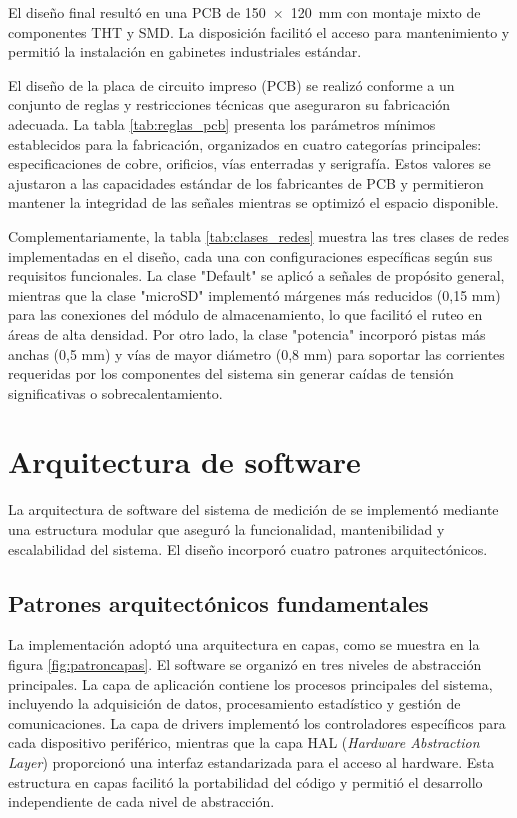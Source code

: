 El diseño final resultó en una PCB de \SI{150x120}{\milli\meter} con montaje mixto de componentes THT y SMD. La disposición facilitó el acceso para mantenimiento y permitió la instalación en gabinetes industriales estándar.

El diseño de la placa de circuito impreso (PCB) se realizó conforme a un conjunto de reglas y restricciones técnicas que aseguraron su fabricación adecuada. La tabla \ref{tab:reglas_pcb} presenta los parámetros mínimos establecidos para la fabricación, organizados en cuatro categorías principales: especificaciones de cobre, orificios, vías enterradas y serigrafía. Estos valores se ajustaron a las capacidades estándar de los fabricantes de PCB y permitieron mantener la integridad de las señales mientras se optimizó el espacio disponible.

Complementariamente, la tabla \ref{tab:clases_redes} muestra las tres clases de redes implementadas en el diseño, cada una con configuraciones específicas según sus requisitos funcionales. La clase "Default" se aplicó a señales de propósito general, mientras que la clase "microSD" implementó márgenes más reducidos (0,15 mm) para las conexiones del módulo de almacenamiento, lo que facilitó el ruteo en áreas de alta densidad. Por otro lado, la clase "potencia" incorporó pistas más anchas (0,5 mm) y vías de mayor diámetro (0,8 mm) para soportar las corrientes requeridas por los componentes del sistema sin generar caídas de tensión significativas o sobrecalentamiento.

\section{Arquitectura de software}

La arquitectura de software del sistema de medición de \MPF se implementó mediante una estructura modular que aseguró la funcionalidad, mantenibilidad y escalabilidad del sistema. El diseño incorporó cuatro patrones arquitectónicos.

\subsection{Patrones arquitectónicos fundamentales}

La implementación adoptó una arquitectura en capas, como se muestra en la figura \ref{fig:patroncapas}. El software se organizó en tres niveles de abstracción principales. La capa de aplicación contiene los procesos principales del sistema, incluyendo la adquisición de datos, procesamiento estadístico y gestión de comunicaciones. La capa de drivers implementó los controladores específicos para cada dispositivo periférico, mientras que la capa HAL (\textit{Hardware Abstraction Layer}) proporcionó una interfaz estandarizada para el acceso al hardware. Esta estructura en capas facilitó la portabilidad del código y permitió el desarrollo independiente de cada nivel de abstracción.

